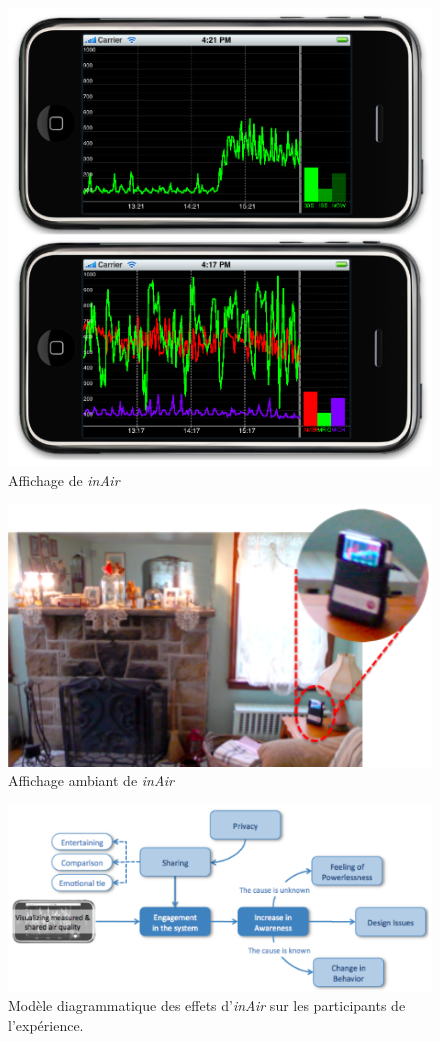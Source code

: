 \documentclass[10pt,a5paper,twoside]{article}
\begin{document}
\begin{figure}
\centering
\includegraphics[width=0.700\hsize]{images/inair-screenshot2.png}
\caption{Affichage de \emph{inAir}}\label{fig:inair2}
\end{figure}

\begin{figure}
\centering
\includegraphics[width=0.900\hsize]{images/inair-screenshot1.png}
\caption{Affichage ambiant de \emph{inAir}}\label{fig:inair3}
\end{figure}

\begin{figure}
\centering
\includegraphics[width=0.900\hsize]{images/inair-diagram.png}
\caption{Modèle diagrammatique des effets d'\emph{inAir} sur les
participants de l'expérience.}\label{fig:inair4}
\end{figure}
\end{document}
